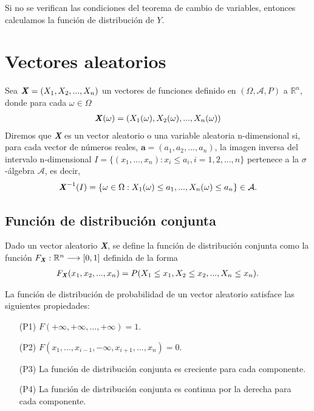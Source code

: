 Si no se verifican las condiciones del teorema de cambio de variables, entonces calculamos la función de distribución de $Y$.

\section{Vectores aleatorios}

\begin{defi}
Sea $\textbf{\textit{X}} = (X_1, X_2,..., X_n)$ un vectores de funciones definido en $(\Omega, \mathcal{A}, P)$ a $\mathbb{R}^n$, donde para cada $\omega \in \Omega$
\begin{align*}
    \textbf{\textit{X}}(\omega) = (X_1(\omega), X_2(\omega),..., X_n(\omega))
\end{align*}
Diremos que \textbf{\textit{X}} es un vector aleatorio o una variable aleatoria n-dimensional si, para cada vector de números reales, $\textbf{a} = (a_1,a_2,...,a_n)$, la imagen inversa del intervalo n-dimensional $I = \{ (x_1,...,x_n) : x_i \leq a_i, i = 1,2,...,n \}$ pertenece a la $\sigma$-álgebra $\mathcal{A}$, es decir,
\begin{align*}
    \textbf{\textit{X}}^{-1}(I) = \{ \omega \in \Omega : X_1(\omega) \leq a_1, ..., X_n(\omega) \leq a_n \} \in \mathcal{A}.
\end{align*}
\end{defi}

\subsection{Función de distribución conjunta}

Dado un vector aleatorio \textbf{\textit{X}}, se define la función de distribución conjunta como la función $F_{\textbf{\textit{X}}} : \mathbb{R}^n \longrightarrow [0,1]$ definida de la forma
\begin{align*}
    F_{\textbf{\textit{X}}}(x_1,x_2,...,x_n) = P(X_1 \leq x_1, X_2 \leq x_2, ..., X_n \leq x_n).
\end{align*}

\begin{teo}
La función de distribución de probabilidad de un vector aleatorio satisface las siguientes propiedades:
\begin{enumerate}
    \item[(P1)] $F(+\infty,+\infty,...,+\infty) = 1$.
    \item[(P2)] $F(x_1,...,x_{i-1},-\infty,x_{i+1},...,x_n) = 0$.
    \item[(P3)] La función de distribución conjunta es creciente para cada componente.
    \item[(P4)] La función de distribución conjunta es continua por la derecha para cada componente.
\end{enumerate}
\end{teo}


